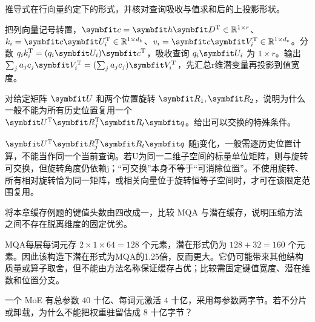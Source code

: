 
\begin{exercises}
\begin{exercise}\optional 推导式在行向量约定下的形式，并核对查询吸收与值求和后的上投影形状。

\begin{solution}
把列向量记号转置，$\vect{c}=\vect{h}\mat{D}^{\mathrm{T}}\in\Real^{1\times r}$、$k_i=\vect{c}\mat{U}_i^{\mathrm{T}}\in\Real^{1\times d_k}$、$v_i=\vect{c}\mat{V}_i^{\mathrm{T}}\in\Real^{1\times d_v}$。分数 $q_i k_i^{\mathrm{T}}=(q_i\mat{U}_i)\vect{c}^{\mathrm{T}}$，吸收查询 $q_i\mat{U}_i$ 为 $1\times r$。输出 $\sum_ja_jc_j\mat{V}_i^{\mathrm{T}}=(\sum_ja_jc_j)\mat{V}_i^{\mathrm{T}}$，先汇总r维潜变量再投影到值宽度。
\end{solution}
\end{exercise}

\begin{exercise}\optional 对给定矩阵 $\mat{U}$ 和两个位置旋转 $\mat{R}_1,\mat{R}_2$，说明为什么一般不能为所有历史位置复用一个 $\mat{U}^{\mathrm{T}}\mat{R}_j^{\mathrm{T}}\mat{R}_t\vect{q}$。给出可以交换的特殊条件。

\begin{solution}
$\mat{U}^{\mathrm{T}}\mat{R}_j^{\mathrm{T}}\mat{R}_t\vect{q}$ 随j变化，一般需逐历史位置计算，不能当作同一个当前查询。若U为同一二维子空间的标量单位矩阵，则与旋转可交换，但旋转角度仍依赖j；“可交换”本身不等于“可消除位置”。不使用旋转、所有相对旋转恰为同一矩阵，或相关向量位于旋转恒等子空间时，才可在该限定范围复用。
\end{solution}
\end{exercise}

\begin{exercise} 将本章缓存例题的键值头数由四改成一，比较 MQA 与潜在缓存，说明压缩方法之间不存在脱离维度的固定优劣。

\begin{solution}
MQA每层每词元存 $2\times1\times64=128$ 个元素，潜在形式仍为 $128+32=160$ 个元素。因此该构造下潜在形式为MQA的1.25倍，反而更大。它仍可能带来其他结构质量或算子取舍，但不能由方法名称保证缓存占优；比较需固定键值宽度、潜在维数和位置分支。
\end{solution}
\end{exercise}

\begin{exercise} 一个 MoE 有总参数 $40$ 十亿、每词元激活 $4$ 十亿，采用每参数两字节。若不分片或卸载，为什么不能把权重驻留估成 $8$ 十亿字节？


\end{exercise}
\end{exercises}
